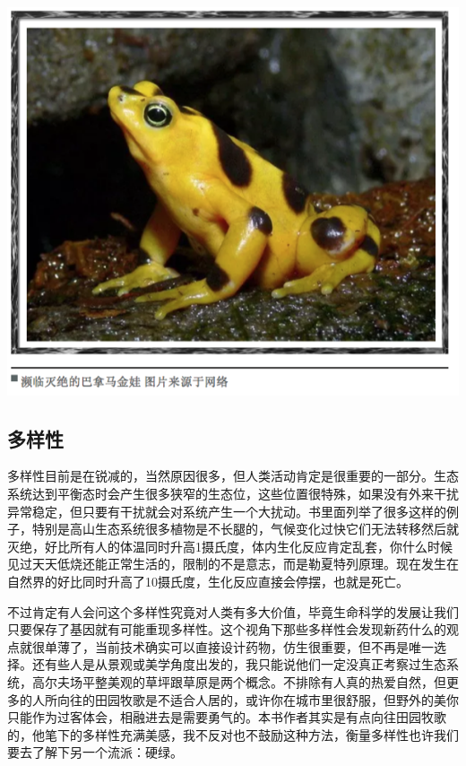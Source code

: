 \documentclass[]{book}
\begin{document}
\includegraphics[width=8.33in]{images/miejue5}

\hypertarget{ux591aux6837ux6027}{%
\subsection{多样性}\label{ux591aux6837ux6027}}

多样性目前是在锐减的，当然原因很多，但人类活动肯定是很重要的一部分。生态系统达到平衡态时会产生很多狭窄的生态位，这些位置很特殊，如果没有外来干扰异常稳定，但只要有干扰就会对系统产生一个大扰动。书里面列举了很多这样的例子，特别是高山生态系统很多植物是不长腿的，气候变化过快它们无法转移然后就灭绝，好比所有人的体温同时升高1摄氏度，体内生化反应肯定乱套，你什么时候见过天天低烧还能正常生活的，限制的不是意志，而是勒夏特列原理。现在发生在自然界的好比同时升高了10摄氏度，生化反应直接会停摆，也就是死亡。

不过肯定有人会问这个多样性究竟对人类有多大价值，毕竟生命科学的发展让我们只要保存了基因就有可能重现多样性。这个视角下那些多样性会发现新药什么的观点就很单薄了，当前技术确实可以直接设计药物，仿生很重要，但不再是唯一选择。还有些人是从景观或美学角度出发的，我只能说他们一定没真正考察过生态系统，高尔夫场平整美观的草坪跟草原是两个概念。不排除有人真的热爱自然，但更多的人所向往的田园牧歌是不适合人居的，或许你在城市里很舒服，但野外的美你只能作为过客体会，相融进去是需要勇气的。本书作者其实是有点向往田园牧歌的，他笔下的多样性充满美感，我不反对也不鼓励这种方法，衡量多样性也许我们要去了解下另一个流派：硬绿。
\end{document}
